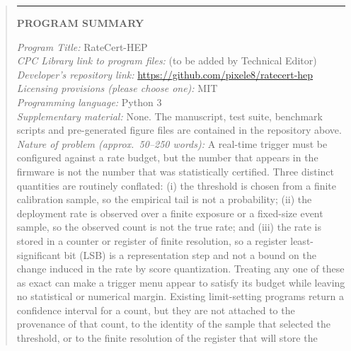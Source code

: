 \documentclass[preprint,12pt]{elsarticle}
\begin{document}
\begin{frontmatter}
\begin{abstract}
\vspace{6pt}
\noindent\rule{\textwidth}{0.4pt}
\vspace{4pt}

\noindent\textbf{PROGRAM SUMMARY}

\begin{small}
\noindent
{\em Program Title:} RateCert-HEP \\
{\em CPC Library link to program files:} (to be added by Technical Editor) \\
{\em Developer's repository link:} \url{https://github.com/pixele8/ratecert-hep} \\
{\em Licensing provisions (please choose one):} MIT \\
{\em Programming language:} Python 3 \\
{\em Supplementary material:} None.  The manuscript, test suite, benchmark
scripts and pre-generated figure files are contained in the repository above. \\
{\em Nature of problem (approx.\ 50--250 words):}
A real-time trigger must be configured against a rate budget, but the number
that appears in the firmware is not the number that was statistically
certified.  Three distinct quantities are routinely conflated: (i) the
threshold is chosen from a finite calibration sample, so the empirical tail is
not a probability; (ii) the deployment rate is observed over a finite exposure
or a fixed-size event sample, so the observed count is not the true rate; and
(iii) the rate is stored in a counter or register of finite resolution, so a
register least-significant bit (LSB) is a representation step and not a bound on
the change induced in the rate by score quantization.  Treating any one of
these as exact can make a trigger menu appear to satisfy its budget while
leaving no statistical or numerical margin.  Existing limit-setting programs
return a confidence interval for a count, but they are not attached to the
provenance of that count, to the identity of the sample that selected the
threshold, or to the finite resolution of the register that will store the

\end{small}
\end{abstract}
\end{frontmatter}
\end{document}
